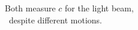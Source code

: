 \documentclass[preview]{standalone}
\begin{document}
\begin{center}
Both measure $c$ for the light beam, \\\ despite different motions.
\end{center}
\end{document}
